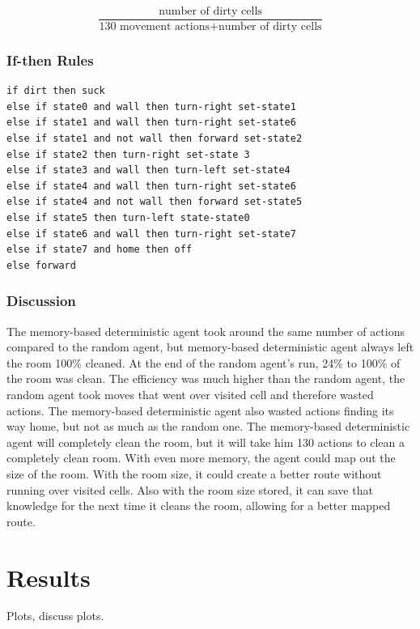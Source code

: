 \documentclass[a4paper,10pt]{article}
\begin{document}
\[\frac{\mbox{number of dirty cells}}{\mbox{130 movement actions} + \mbox{number of dirty cells}}\] 

\subsubsection{If-then Rules}
\begin{verbatim}
if dirt then suck
else if state0 and wall then turn-right set-state1
else if state1 and wall then turn-right set-state6
else if state1 and not wall then forward set-state2
else if state2 then turn-right set-state 3
else if state3 and wall then turn-left set-state4
else if state4 and wall then turn-right set-state6
else if state4 and not wall then forward set-state5
else if state5 then turn-left state-state0
else if state6 and wall then turn-right set-state7
else if state7 and home then off
else forward
\end{verbatim}

\subsubsection{Discussion}

The memory-based deterministic agent took around the same number of actions compared to the random agent, but memory-based deterministic agent always left the room 100\% cleaned.
At the end of the random agent's run, 24\% to 100\% of the room was clean.
The efficiency was much higher than the random agent, the random agent took moves that went over visited cell and therefore wasted actions.
The memory-based deterministic agent also wasted actions finding its way home, but not as much as the random one.
The memory-based deterministic agent will completely clean the room, but it will take him 130 actions to clean a completely clean room.
With even more memory, the agent could map out the size of the room.
With the room size, it could create a better route without running over visited cells.
Also with the room size stored, it can save that knowledge for the next time it cleans the room, allowing for a better mapped route.


\section{Results}
Plots, discuss plots.
\end{document}
